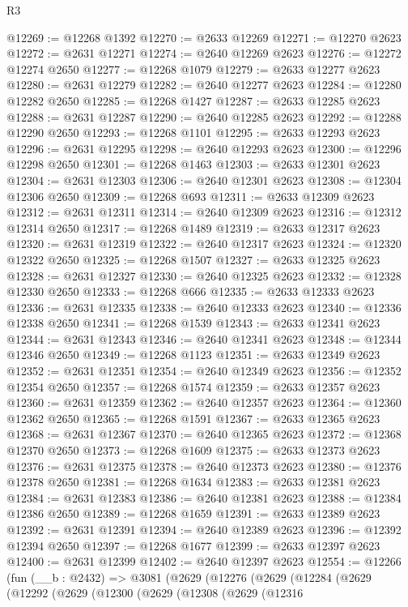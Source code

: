 \begin{lexlean}{R3}
\begin{coremodule}
@12269 := @12268 @1392
@12270 := @2633 @12269
@12271 := @12270 @2623
@12272 := @2631 @12271
@12274 := @2640 @12269 @2623
@12276 := @12272 @12274 @2650
@12277 := @12268 @1079
@12279 := @2633 @12277 @2623
@12280 := @2631 @12279
@12282 := @2640 @12277 @2623
@12284 := @12280 @12282 @2650
@12285 := @12268 @1427
@12287 := @2633 @12285 @2623
@12288 := @2631 @12287
@12290 := @2640 @12285 @2623
@12292 := @12288 @12290 @2650
@12293 := @12268 @1101
@12295 := @2633 @12293 @2623
@12296 := @2631 @12295
@12298 := @2640 @12293 @2623
@12300 := @12296 @12298 @2650
@12301 := @12268 @1463
@12303 := @2633 @12301 @2623
@12304 := @2631 @12303
@12306 := @2640 @12301 @2623
@12308 := @12304 @12306 @2650
@12309 := @12268 @693
@12311 := @2633 @12309 @2623
@12312 := @2631 @12311
@12314 := @2640 @12309 @2623
@12316 := @12312 @12314 @2650
@12317 := @12268 @1489
@12319 := @2633 @12317 @2623
@12320 := @2631 @12319
@12322 := @2640 @12317 @2623
@12324 := @12320 @12322 @2650
@12325 := @12268 @1507
@12327 := @2633 @12325 @2623
@12328 := @2631 @12327
@12330 := @2640 @12325 @2623
@12332 := @12328 @12330 @2650
@12333 := @12268 @666
@12335 := @2633 @12333 @2623
@12336 := @2631 @12335
@12338 := @2640 @12333 @2623
@12340 := @12336 @12338 @2650
@12341 := @12268 @1539
@12343 := @2633 @12341 @2623
@12344 := @2631 @12343
@12346 := @2640 @12341 @2623
@12348 := @12344 @12346 @2650
@12349 := @12268 @1123
@12351 := @2633 @12349 @2623
@12352 := @2631 @12351
@12354 := @2640 @12349 @2623
@12356 := @12352 @12354 @2650
@12357 := @12268 @1574
@12359 := @2633 @12357 @2623
@12360 := @2631 @12359
@12362 := @2640 @12357 @2623
@12364 := @12360 @12362 @2650
@12365 := @12268 @1591
@12367 := @2633 @12365 @2623
@12368 := @2631 @12367
@12370 := @2640 @12365 @2623
@12372 := @12368 @12370 @2650
@12373 := @12268 @1609
@12375 := @2633 @12373 @2623
@12376 := @2631 @12375
@12378 := @2640 @12373 @2623
@12380 := @12376 @12378 @2650
@12381 := @12268 @1634
@12383 := @2633 @12381 @2623
@12384 := @2631 @12383
@12386 := @2640 @12381 @2623
@12388 := @12384 @12386 @2650
@12389 := @12268 @1659
@12391 := @2633 @12389 @2623
@12392 := @2631 @12391
@12394 := @2640 @12389 @2623
@12396 := @12392 @12394 @2650
@12397 := @12268 @1677
@12399 := @2633 @12397 @2623
@12400 := @2631 @12399
@12402 := @2640 @12397 @2623
@12554 := @12266
    (fun (__b : @2432) =>
    @3081
      (@2629
        (@12276
          (@2629
            (@12284
              (@2629
                (@12292
                  (@2629
                    (@12300
                      (@2629
                        (@12308
                          (@2629
                            (@12316

\end{coremodule}
\end{lexlean}
